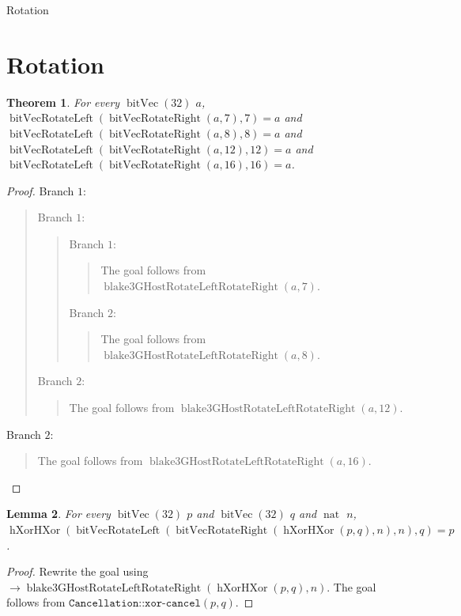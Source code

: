\documentclass[11pt]{article}
\newtheorem{theorem}{Theorem}[section]
\newtheorem{lemma}[theorem]{Lemma}
\theoremstyle{definition}
\begin{document}
\begin{center}
{\LARGE Rotation}
\end{center}
\section{Rotation}
\label{ll:rotation:rotation}
\begin{theorem}
\label{ll:rotation:rotate-left-right}
For every \(\operatorname{bitVec}(32)\) \(a\), \(\operatorname{bitVecRotateLeft}(\operatorname{bitVecRotateRight}(a, 7), 7) = a\) and \(\operatorname{bitVecRotateLeft}(\operatorname{bitVecRotateRight}(a, 8), 8) = a\) and \(\operatorname{bitVecRotateLeft}(\operatorname{bitVecRotateRight}(a, 12), 12) = a\) and \(\operatorname{bitVecRotateLeft}(\operatorname{bitVecRotateRight}(a, 16), 16) = a\).
\end{theorem}
\begin{proof}
Branch \(1\):
\begin{quote}
Branch \(1\):
\begin{quote}
Branch \(1\):
\begin{quote}
The goal follows from \(\operatorname{blake3GHostRotateLeftRotateRight}(a, 7)\).
\end{quote}
Branch \(2\):
\begin{quote}
The goal follows from \(\operatorname{blake3GHostRotateLeftRotateRight}(a, 8)\).
\end{quote}
\end{quote}
Branch \(2\):
\begin{quote}
The goal follows from \(\operatorname{blake3GHostRotateLeftRotateRight}(a, 12)\).
\end{quote}
\end{quote}
Branch \(2\):
\begin{quote}
The goal follows from \(\operatorname{blake3GHostRotateLeftRotateRight}(a, 16)\).
\end{quote}
\end{proof}
\begin{lemma}
\label{ll:rotation:unmix}
For every \(\operatorname{bitVec}(32)\) \(p\) and \(\operatorname{bitVec}(32)\) \(q\) and \(\operatorname{nat}\) \(n\), \(\operatorname{hXorHXor}(\operatorname{bitVecRotateLeft}(\operatorname{bitVecRotateRight}(\operatorname{hXorHXor}(p, q), n), n), q) = p\).
\end{lemma}
\begin{proof}
Rewrite the goal using \(\rightarrow \operatorname{blake3GHostRotateLeftRotateRight}(\operatorname{hXorHXor}(p, q), n)\).
The goal follows from \(\texttt{Cancellation::xor-cancel}(p, q)\).
\end{proof}
\end{document}
